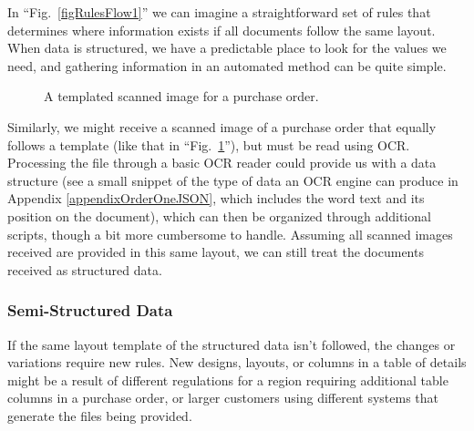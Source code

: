 \documentclass[conference]{IEEEtran}
\begin{document}
In ``Fig.~\ref{figRulesFlow1}'' we can imagine a straightforward set of rules that determines where information exists if all documents follow the same layout. When data is structured, we have a predictable place to look for the values we need, and gathering information in an automated method can be quite simple.

\begin{figure}[ht]
\centerline{
}
\caption{A templated scanned image for a purchase order.}
\label{figScanned1}
\end{figure}

Similarly, we might receive a scanned image of a purchase order that equally follows a template (like that in ``Fig.~\ref{figScanned1}''), but must be read using OCR. Processing the file through a basic OCR reader could provide us with a data structure (see a small snippet of the type of data an OCR engine can produce in Appendix \ref{appendixOrderOneJSON}, which includes the word text and its position on the document), which can then be organized through additional scripts, though a bit more cumbersome to handle. Assuming all scanned images received are provided in this same layout, we can still treat the documents received as structured data.

\subsubsection{Semi-Structured Data}
If the same layout template of the structured data isn't followed, the changes or variations require new rules. New designs, layouts, or columns in a table of details might be a result of different regulations for a region requiring additional table columns in a purchase order, or larger customers using different systems that generate the files being provided.
\end{document}
